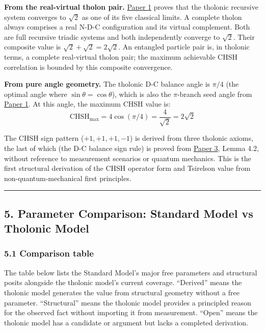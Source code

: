 \documentclass[
  11pt,
  letterpaper,
]{article}
\begin{document}
\textbf{From the real-virtual tholon pair.}
\href{https://github.com/baardev/truevalue/blob/main/docnav/Research/papers/1_recursive-tholonic-five-constants/1_recursive-tholonic-five-constants.pdf}{Paper
1} proves that the tholonic recursive system converges to \(\sqrt{2}\)
as one of its five classical limits. A complete tholon always comprises
a real N-D-C configuration and its virtual complement. Both are full
recursive triadic systems and both independently converge to
\(\sqrt{2}\). Their composite value is
\(\sqrt{2} + \sqrt{2} = 2\sqrt{2}\). An entangled particle pair is, in
tholonic terms, a complete real-virtual tholon pair; the maximum
achievable CHSH correlation is bounded by this composite convergence.

\textbf{From pure angle geometry.} The tholonic D-C balance angle is
\(\pi/4\) (the optimal angle where \(\sin\theta = \cos\theta\)), which
is also the \(\pi\)-branch seed angle from
\href{https://github.com/baardev/truevalue/blob/main/docnav/Research/papers/1_recursive-tholonic-five-constants/1_recursive-tholonic-five-constants.pdf}{Paper
1}. At this angle, the maximum CHSH value is:
\[\text{CHSH}_{\max} = 4\cos(\pi/4) = \frac{4}{\sqrt{2}} = 2\sqrt{2}\]

The CHSH sign pattern (\(+1, +1, +1, -1\)) is derived from three
tholonic axioms, the last of which (the D-C balance sign rule) is proved
from
\href{https://github.com/baardev/truevalue/blob/main/docnav/Research/papers/3_minimal-recursive-triadic-framework/3_minimal-recursive-triadic-framework.pdf}{Paper
3}, Lemma 4.2, without reference to measurement scenarios or quantum
mechanics. This is the first structural derivation of the CHSH operator
form and Tsirelson value from non-quantum-mechanical first principles.

\begin{center}\rule{0.5\linewidth}{0.5pt}\end{center}

\subsection{5. Parameter Comparison: Standard Model vs Tholonic
Model}\label{parameter-comparison-standard-model-vs-tholonic-model}

\subsubsection{5.1 Comparison table}\label{comparison-table}

The table below lists the Standard Model's major free parameters and
structural posits alongside the tholonic model's current coverage.
``Derived'' means the tholonic model generates the value from structural
geometry without a free parameter. ``Structural'' means the tholonic
model provides a principled reason for the observed fact without
importing it from measurement. ``Open'' means the tholonic model has a
candidate or argument but lacks a completed derivation.
\end{document}
